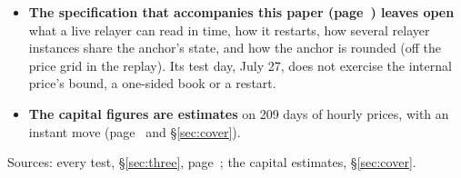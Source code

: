 \begin{itemize}[leftmargin=1.3em,itemsep=.6ex,topsep=0pt]
\item \textbf{The specification that accompanies this paper (page~\pageref{sec:tests}) leaves open} what a live relayer can read in time, how it restarts, how several relayer instances share the anchor's state, and how the anchor is rounded (off the price grid in the replay). Its test day, July 27, does not exercise the internal price's bound, a one-sided book or a restart.
\item \textbf{The capital figures are estimates} on 209 days of hourly prices, with an instant move (page~\pageref{sec:capital} and \S\ref{sec:cover}).
\end{itemize}

\par{\small\color{mute}Sources: every test, \S\ref{sec:three}, page~\pageref{sec:three}; the capital estimates, \S\ref{sec:cover}.\par}

